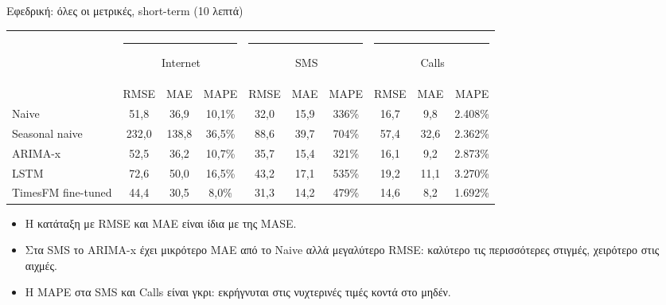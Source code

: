 \documentclass[aspectratio=169,10pt]{beamer}
\newcommand{\muted}[1]{\textcolor{muted}{#1}}
\newcommand{\ser}[2]{\textcolor{#1}{\rule[0.05em]{0.6em}{0.6em}}\,#2}
\newcommand{\sInet}{\ser{inet}{Internet}}
\newcommand{\sSms}{\ser{sms}{SMS}}
\newcommand{\sCalls}{\ser{calls}{Calls}}
\begin{document}
\begin{frame}{Εφεδρική: όλες οι μετρικές, short-term (10 λεπτά)}
  \centering
  \footnotesize\setlength{\tabcolsep}{4.5pt}
  \begin{tabular}{@{}lccccccccc@{}}
    \toprule
    & \multicolumn{3}{c}{\sInet} & \multicolumn{3}{c}{\sSms} & \multicolumn{3}{c}{\sCalls} \\
    \cmidrule(lr){2-4}\cmidrule(lr){5-7}\cmidrule(l){8-10}
    & RMSE & MAE & MAPE & RMSE & MAE & MAPE & RMSE & MAE & MAPE \\
    \midrule
    Naive              & 51,8 & 36,9 & 10,1\% & 32,0 & 15,9 & \muted{336\%} & 16,7 & 9,8 & \muted{2.408\%} \\
    Seasonal naive     & 232,0 & 138,8 & 36,5\% & 88,6 & 39,7 & \muted{704\%} & 57,4 & 32,6 & \muted{2.362\%} \\
    ARIMA-x            & 52,5 & 36,2 & 10,7\% & 35,7 & 15,4 & \muted{321\%} & 16,1 & 9,2 & \muted{2.873\%} \\
    LSTM               & 72,6 & 50,0 & 16,5\% & 43,2 & 17,1 & \muted{535\%} & 19,2 & 11,1 & \muted{3.270\%} \\
    TimesFM fine-tuned & \alert{44,4} & \alert{30,5} & \alert{8,0\%} & \alert{31,3} & \alert{14,2} & \muted{479\%} & \alert{14,6} & \alert{8,2} & \muted{1.692\%} \\
    \bottomrule
  \end{tabular}

  \vspace{0.8em}
  \raggedright\small
  \begin{itemize}
    \item Η κατάταξη με RMSE και MAE είναι ίδια με της MASE.
    \item Στα SMS το ARIMA-x έχει μικρότερο MAE από το Naive αλλά \alert{μεγαλύτερο RMSE}: καλύτερο τις περισσότερες στιγμές, χειρότερο στις αιχμές.
    \item Η MAPE στα SMS και Calls είναι γκρι: εκρήγνυται στις νυχτερινές τιμές κοντά στο μηδέν.
  \end{itemize}
\end{frame}
\end{document}
